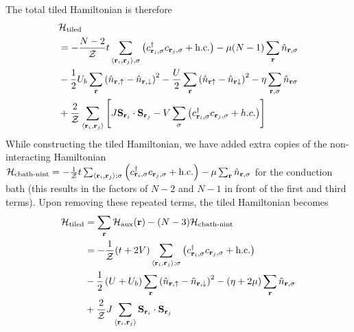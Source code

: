 \documentclass[reprint,hidelinks]{revtex4-2}
\begin{document}
The total tiled Hamiltonian is therefore
\begin{equation}\begin{aligned}
	&\mathcal{H}_\text{tiled} \\
	&= -\frac{N-2}{\mathcal{Z}}t\sum_{\left<{\bf r}_i, {\bf r}_j\right>,\sigma}\left(c^\dagger_{{\bf r}_i,\sigma}c_{{\bf r}_j,\sigma} + \text{h.c.}\right) - \mu (N-1) \sum_{{\bf r}}\hat n_{{\bf r},\sigma}\\
	&- \frac{1}{2}U_b\sum_{\bf r}\left(\hat n_{{\bf r} , \uparrow} - \hat n_{{\bf r} , \downarrow}\right)^2  -\frac{U}{2}\sum_{{\bf r}}\left(\hat n_{{\bf r} \uparrow} - \hat n_{{\bf r} \downarrow} \right)^2 - \eta\sum_{{\bf r},\sigma} \hat n_{{\bf r}\sigma}\\
	& + \frac{2}{\mathcal{Z}}\sum_{\left< {\bf r}_i, {\bf r}_j\right>}\left[J {\bf S}_{{\bf r}_i}\cdot{\bf S}_{{\bf r}_j} - V \sum_{\sigma}\left(c^\dagger_{{\bf r}_i,\sigma} c_{{{\bf r}_j},\sigma} + h.c.\right)\right]
\end{aligned}\end{equation}
While constructing the tiled Hamiltonian, we have added extra copies of the non-interacting Hamiltonian \(\mathcal{H}_\text{cbath-nint} = -\frac{1}{\mathcal{Z}}t\sum_{\left<{\bf r}_i, {\bf r}_j\right>;\sigma}\left(c^\dagger_{{\bf r}_i,\sigma}c_{{\bf r}_j,\sigma} + \text{h.c.}\right) - \mu \sum_{{\bf r}}\hat n_{{\bf r},\sigma}\) for the conduction bath (this results in the factors of \(N-2\) and \(N-1\) in front of the first and third terms). Upon removing these repeated terms, the tiled Hamiltonian becomes
\begin{equation}\begin{aligned}
	\mathcal{H}_\text{tiled} &= \sum_{{\bf r}}\mathcal{H}_\text{aux}({\bf r}) - (N-3)\mathcal{H}_\text{cbath-nint}\\
							 &= -\frac{1}{\mathcal{Z}}(t + 2V)\sum_{\left<{\bf r}_i, {\bf r}_j\right>;\sigma}\left(c^\dagger_{{\bf r}_i,\sigma}c_{{\bf r}_j,\sigma} + \text{h.c.}\right) \\
							 &- \frac{1}{2}\left(U + U_b\right)\sum_{\bf r}\left(\hat n_{{\bf r} , \uparrow} - \hat n_{{\bf r} , \downarrow}\right)^2 - \left(\eta + 2\mu\right) \sum_{{\bf r}}\hat n_{{\bf r},\sigma} \\
							 &+ \frac{2}{\mathcal{Z}}J\sum_{\left< {\bf r}_i, {\bf r}_j\right>} {\bf S}_{{\bf r}_i}\cdot{\bf S}_{{\bf r}_j}
\end{aligned}\end{equation}
\end{document}
